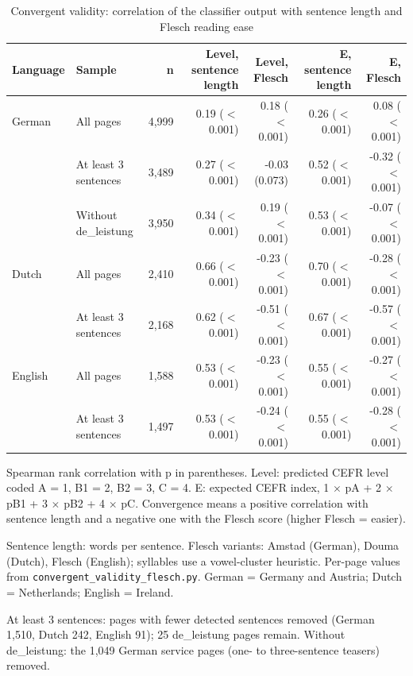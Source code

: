 \begin{table}[htbp]
\centering
\footnotesize\setlength{\tabcolsep}{4pt}
\begin{threeparttable}
\caption{Convergent validity: correlation of the classifier output with sentence length and Flesch reading ease}
\label{tab:convergent}
\begin{tabular}{llrrrrr}
\hline
Language & Sample & n & Level, sentence length & Level, Flesch & E, sentence length & E, Flesch \\
\hline
German & All pages & 4,999 & 0.19 ($<$0.001) & 0.18 ($<$0.001) & 0.26 ($<$0.001) & 0.08 ($<$0.001) \\
 & At least 3 sentences & 3,489 & 0.27 ($<$0.001) & -0.03 (0.073) & 0.52 ($<$0.001) & -0.32 ($<$0.001) \\
 & Without de\_leistung & 3,950 & 0.34 ($<$0.001) & 0.19 ($<$0.001) & 0.53 ($<$0.001) & -0.07 ($<$0.001) \\
\hline
Dutch & All pages & 2,410 & 0.66 ($<$0.001) & -0.23 ($<$0.001) & 0.70 ($<$0.001) & -0.28 ($<$0.001) \\
 & At least 3 sentences & 2,168 & 0.62 ($<$0.001) & -0.51 ($<$0.001) & 0.67 ($<$0.001) & -0.57 ($<$0.001) \\
\hline
English & All pages & 1,588 & 0.53 ($<$0.001) & -0.23 ($<$0.001) & 0.55 ($<$0.001) & -0.27 ($<$0.001) \\
 & At least 3 sentences & 1,497 & 0.53 ($<$0.001) & -0.24 ($<$0.001) & 0.55 ($<$0.001) & -0.28 ($<$0.001) \\
\hline
\end{tabular}
\begin{tablenotes}
\footnotesize
\item Spearman rank correlation with p in parentheses. Level: predicted CEFR level coded A = 1, B1 = 2, B2 = 3, C = 4. E: expected CEFR index, 1 $\times$ pA + 2 $\times$ pB1 + 3 $\times$ pB2 + 4 $\times$ pC. Convergence means a positive correlation with sentence length and a negative one with the Flesch score (higher Flesch = easier).
\item Sentence length: words per sentence. Flesch variants: Amstad (German), Douma (Dutch), Flesch (English); syllables use a vowel-cluster heuristic. Per-page values from \texttt{convergent\_validity\_flesch.py}. German = Germany and Austria; Dutch = Netherlands; English = Ireland.
\item At least 3 sentences: pages with fewer detected sentences removed (German 1,510, Dutch 242, English 91); 25 de\_leistung pages remain. Without de\_leistung: the 1,049 German service pages (one- to three-sentence teasers) removed.
\end{tablenotes}
\end{threeparttable}
\end{table}
